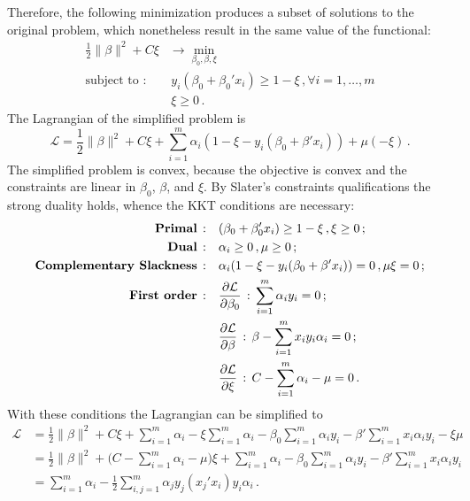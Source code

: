 \documentclass[a4paper]{article}
\begin{document}
Therefore, the following minimization produces a subset of solutions to the original
problem, which nonetheless result in the same value of the functional:
\begin{align*}
  \frac{1}{2}\|\beta\|^2 + C\xi
      &\to \min_{\beta_0, \beta, \xi} \\
  \text{subject to :}\,
      &\,y_i(\beta_0 + \beta_0'x_i) \geq 1 - \xi\,, \forall i=1,\ldots, m \\
      &\,\xi \geq 0 \,.
\end{align*}
The Lagrangian of the simplified problem is
\begin{equation*}
  \mathcal{L}
    = \frac{1}{2} \|\beta\|^2 + C \xi
    + \sum_{i=1}^m \alpha_i (1 - \xi - y_i (\beta_0 + \beta'x_i))
    + \mu ( -\xi) \,.
\end{equation*}
The simplified problem is convex, because the objective is convex and the constraints
are linear in $\beta_0$, $\beta$, and $\xi$. By Slater's constraints qualifications
the strong duality holds, whence the KKT conditions are necessary:
\begin{align*}
  \text{\textbf{Primal}}\,:\quad
        & (\beta_0 + \beta_0'x_i) \geq 1 - \xi\,, \xi\geq 0\,; \\
  \text{\textbf{Dual}}\,:\quad
        & \alpha_i\geq 0\,, \mu\geq 0\,; \\
  \text{\textbf{Complementary Slackness}}\,:\quad
        & \alpha_i(1 - \xi - y_i(\beta_0 + \beta'x_i)) = 0\,, \mu \xi = 0\,; \\
  \text{\textbf{First order}}\,:\quad
        &\frac{\partial \mathcal{L}}{\partial \beta_0}\,
          :\, \sum_{i=1}^m \alpha_i y_i = 0\,; \\
        &\frac{\partial \mathcal{L}}{\partial \beta}\,
          :\, \beta - \sum_{i=1}^m x_i y_i \alpha_i = 0\,; \\
        &\frac{\partial \mathcal{L}}{\partial \xi}\,
          :\, C  - \sum_{i=1}^m \alpha_i - \mu = 0\,.
\end{align*}
With these conditions the Lagrangian can be simplified to
\begin{align*}
  \mathcal{L}
    &= \frac{1}{2} \|\beta\|^2 + C \xi
    + \sum_{i=1}^m \alpha_i
    - \xi \sum_{i=1}^m \alpha_i
    - \beta_0 \sum_{i=1}^m \alpha_i y_i
    - \beta'\sum_{i=1}^m x_i \alpha_i y_i
    - \xi \mu \\
    &= \frac{1}{2} \|\beta\|^2
    + \bigl(C - \sum_{i=1}^m \alpha_i - \mu\bigr) \xi
    + \sum_{i=1}^m \alpha_i
    - \beta_0 \sum_{i=1}^m \alpha_i y_i
    - \beta' \sum_{i=1}^m x_i \alpha_i y_i \\
    &= \sum_{i=1}^m \alpha_i - \frac{1}{2}
        \sum_{i,j=1}^m \alpha_j y_j (x_j'x_i) y_i \alpha_i \,.
\end{align*}
\end{document}
